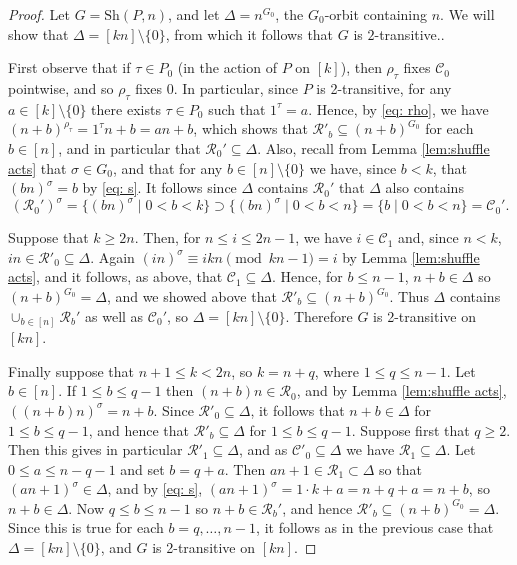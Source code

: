 \documentclass[12pt]{amsart}
\theoremstyle{remark}
\theoremstyle{definition}
\newcommand{\sh}{\mathrm{Sh}}
\begin{document}
\begin{proof}
Let $G = \sh(P,n)$, and let $\Delta = n^{G_0}$, the $G_0$-orbit containing $n$. We will show that $\Delta = [kn] \setminus \{0\}$, 
from which it follows that $G$ is $2$-transitive..

First observe that if $\tau \in P_0$ (in the action of $P$ on $[k]$), then $\rho_\tau$ fixes $\mathcal{C}_0$ pointwise, and so $\rho_\tau$ fixes $0$. In particular, since $P$ is 2-transitive, for any $a \in [k] \setminus \{0\}$ there exists $\tau \in P_0$ such that $1^\tau = a$. Hence, by \eqref{eq: rho}, we have $(n+b)^{\rho_\tau} = 1^\tau n + b = an + b$, which shows that $\mathcal{R}'_b \subseteq (n+b)^{G_0}$ for each $b \in [n]$, and in particular that $\mathcal{R}_0'\subseteq \Delta$. Also, recall from Lemma \ref{lem:shuffle acts} that $\sigma \in G_0$, and that for any $b \in [n] \setminus \{0\}$ we have, since $b < k$, that $(bn)^\sigma = b$ by \eqref{eq: s}.  It follows since $\Delta$ contains $\mathcal{R}_0'$ that $\Delta$ also contains 
\[
(\mathcal{R}_0')^\sigma = \{   (bn)^\sigma  \mid 0 < b < k\} \supset  \{   (bn)^\sigma  \mid 0 < b < n\} =  \{   b  \mid 0 < b < n\} = \mathcal{C}_0'.
\]

Suppose that $k \geqslant 2n$. Then, for $n \leqslant i \leqslant 2n-1$, we have $i \in \mathcal{C}_1$ and, since $n < k$, $in \in \mathcal{R}'_0 \subseteq \Delta$. Again $(in)^\sigma \equiv ikn \pmod{kn-1} = i$ by Lemma \ref{lem:shuffle acts}, and it follows, as above, that $\mathcal{C}_1 \subseteq \Delta$. Hence, for $b\leqslant n-1$, $n+b \in \Delta$ so $(n+b)^{G_0} = \Delta$, and we showed above that $\mathcal{R}'_b \subseteq  (n+b)^{G_0}$. Thus $\Delta$ contains $\cup_{b\in [n]}\mathcal{R}_b'$ as well as $\mathcal{C}_0'$, so $\Delta = [kn] \setminus \{0\}$. Therefore $G$ is 2-transitive on $[kn]$.

Finally suppose that $n+1 \leqslant k < 2n$, so $k = n+q$, where $1 \leqslant q \leqslant n-1$. Let $b \in [n]$. If $1 \leqslant b \leqslant q-1$ then $(n+b)n \in \mathcal{R}_0$, and by Lemma \ref{lem:shuffle acts}, $((n+b)n)^\sigma = n+b$. Since $\mathcal{R}'_0 \subseteq\Delta$, it follows that $n+b \in \Delta$ for $1 \leqslant b \leqslant q-1$, and hence that $\mathcal{R}'_b \subseteq\Delta$ for $1 \leqslant b \leqslant q-1$. Suppose first that $q \geqslant 2$.
 Then this gives in particular $\mathcal{R}'_1 \subseteq \Delta$, and as $\mathcal{C}'_0 \subseteq \Delta$ we have $\mathcal{R}_1 \subseteq \Delta$. 
Let $0 \leqslant a \leqslant n-q-1$ and set $b = q+a$.  Then $an+1 \in \mathcal{R}_1\subset \Delta$ so that $(an+1)^\sigma\in\Delta$, 
and by  \eqref{eq: s}, $(an+1)^\sigma =1\cdot k + a = n+q+a =  n+b$, so $n+b\in\Delta$.  Now $q \leqslant b \leqslant n-1$ so $n+b\in \mathcal{R}_b'$,
and hence $\mathcal{R}'_b \subseteq (n+b)^{G_0} = \Delta$. Since this is true for each $b=q,\dots, n-1$, it follows as in the previous case that
 $\Delta = [kn] \setminus \{0\}$, and $G$ is 2-transitive on $[kn]$.


\end{proof}
\end{document}
